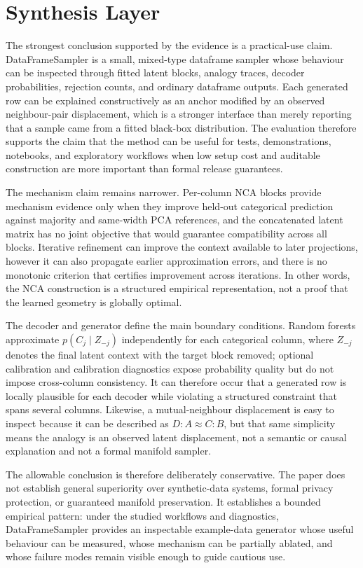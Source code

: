 \section{Synthesis Layer}

The strongest conclusion supported by the evidence is a practical-use claim.
DataFrameSampler is a small, mixed-type dataframe sampler whose behaviour can
be inspected through fitted latent blocks, analogy traces, decoder
probabilities, rejection counts, and ordinary dataframe outputs. Each generated
row can be explained constructively as an anchor modified by an observed
neighbour-pair displacement, which is a stronger interface than merely reporting
that a sample came from a fitted black-box distribution. The evaluation
therefore supports the claim that the method can be useful for tests,
demonstrations, notebooks, and exploratory workflows when low setup cost and
auditable construction are more important than formal release guarantees.

The mechanism claim remains narrower. Per-column NCA blocks provide mechanism
evidence only when they improve held-out categorical prediction against
majority and same-width PCA references, and the concatenated latent matrix has
no joint objective that would guarantee compatibility across all blocks.
Iterative refinement can improve the context available to later projections,
however it can also propagate earlier approximation errors, and there is no
monotonic criterion that certifies improvement across iterations. In other
words, the NCA construction is a structured empirical representation, not a
proof that the learned geometry is globally optimal.

The decoder and generator define the main boundary conditions. Random forests
approximate $p(C_j \mid Z_{-j})$ independently for each categorical column,
where $Z_{-j}$ denotes the final latent context with the target block removed;
optional calibration and calibration diagnostics expose probability quality but
do not impose cross-column consistency. It can therefore occur that a generated
row is locally plausible for each decoder while violating a structured
constraint that spans several columns. Likewise, a mutual-neighbour displacement
is easy to inspect because it can be described as $D:A\approx C:B$, but that
same simplicity means the analogy is an observed latent displacement, not a
semantic or causal explanation and not a formal manifold sampler.

The allowable conclusion is therefore deliberately conservative. The paper
does not establish general superiority over synthetic-data systems, formal
privacy protection, or guaranteed manifold preservation. It establishes a
bounded empirical pattern: under the studied workflows and diagnostics,
DataFrameSampler provides an inspectable example-data generator whose useful
behaviour can be measured, whose mechanism can be partially ablated, and whose
failure modes remain visible enough to guide cautious use.
